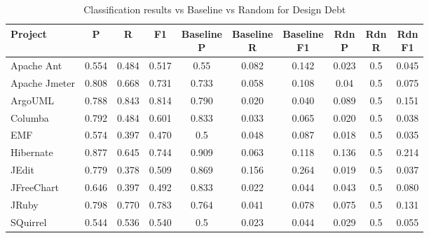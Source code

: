 \begin{table}[!hbt]
    \begin{center}
        \caption{Classification results vs Baseline vs Random for Design Debt}
        \label{tbl:classifier_results_vs_baseline_design}
        \begin{tabular}{l| c c c c c c c c c}
        \toprule
        \textbf{Project} & \textbf{P} & \textbf{R} & \textbf{F1} & \thead{Baseline\\P} & \thead{Baseline\\R} & \thead{Baseline\\F1} & \thead{Rdn\\P} & \thead{Rdn\\R} & \thead{Rdn\\F1} \\
        \midrule
        Apache Ant    &  0.554   &  0.484  &  0.517  & 0.55    & 0.082  & 0.142  &  0.023 &  0.5 &  0.045  \\
        Apache Jmeter &  0.808   &  0.668  &  0.731  & 0.733   & 0.058  & 0.108  &  0.04  &  0.5 &  0.075  \\
        ArgoUML       &  0.788   &  0.843  &  0.814  & 0.790   & 0.020  & 0.040  &  0.089 &  0.5 &  0.151  \\
        Columba       &  0.792   &  0.484  &  0.601  & 0.833   & 0.033  & 0.065  &  0.020 &  0.5 &  0.038  \\
        EMF           &  0.574   &  0.397  &  0.470  & 0.5     & 0.048  & 0.087  &  0.018 &  0.5 &  0.035  \\
        Hibernate     &  0.877   &  0.645  &  0.744  & 0.909   & 0.063  & 0.118  &  0.136 &  0.5 &  0.214  \\
        JEdit         &  0.779   &  0.378  &  0.509  & 0.869   & 0.156  & 0.264  &  0.019 &  0.5 &  0.037  \\
        JFreeChart    &  0.646   &  0.397  &  0.492  & 0.833   & 0.022  & 0.044  &  0.043 &  0.5 &  0.080  \\
        JRuby         &  0.798   &  0.770  &  0.783  & 0.764   & 0.041  & 0.078  &  0.075 &  0.5 &  0.131  \\
        SQuirrel      &  0.544   &  0.536  &  0.540  & 0.5     & 0.023  & 0.044  &  0.029 &  0.5 &  0.055  \\
        \bottomrule
        \end{tabular}
    \end{center}    
\end{table}

